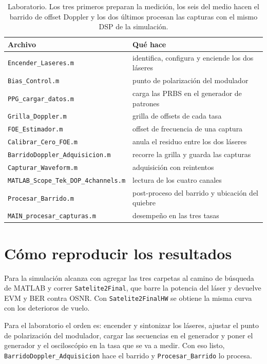 \begin{table}[htbp]
  \centering
  \small
  \begin{tabular}{ll}
    \toprule
    Archivo & Qu\'e hace \\
    \midrule
    \texttt{Encender\_Laseres.m}        & identifica, configura y enciende los dos l\'aseres \\
    \texttt{Bias\_Control.m}            & punto de polarizaci\'on del modulador \\
    \texttt{PPG\_cargar\_datos.m}       & carga las PRBS en el generador de patrones \\
    \midrule
    \texttt{Grilla\_Doppler.m}          & grilla de offsets de cada tasa \\
    \texttt{FOE\_Estimador.m}           & offset de frecuencia de una captura \\
    \texttt{Calibrar\_Cero\_FOE.m}      & anula el residuo entre los dos l\'aseres \\
    \texttt{BarridoDoppler\_Adquisicion.m} & recorre la grilla y guarda las capturas \\
    \texttt{Capturar\_Waveform.m}       & adquisici\'on con reintentos \\
    \texttt{MATLAB\_Scope\_Tek\_DOP\_4channels.m} & lectura de los cuatro canales \\
    \midrule
    \texttt{Procesar\_Barrido.m}        & post-proceso del barrido y ubicaci\'on del quiebre \\
    \texttt{MAIN\_procesar\_capturas.m} & desempe\~no en las tres tasas \\
    \bottomrule
  \end{tabular}
  \caption[Programas del laboratorio]{%
    Laboratorio. Los tres primeros preparan la medici\'on, los seis del medio
    hacen el barrido de offset Doppler y los dos \'ultimos procesan las
    capturas con el mismo DSP de la simulaci\'on.}
  \label{tab:ap-codigos-lab}
\end{table}

\section{C\'omo reproducir los resultados}
\label{sec:ap-reproducir}

Para la simulaci\'on alcanza con agregar las tres carpetas al camino de
b\'usqueda de MATLAB y correr \texttt{Satelite2Final}, que barre la potencia
del l\'aser y devuelve EVM y BER contra OSNR. Con \texttt{Satelite2FinalHW} se
obtiene la misma curva con los deterioros de vuelo. 

Para el laboratorio el orden es: encender y sintonizar los l\'aseres, ajustar
el punto de polarizaci\'on del modulador, cargar las secuencias en el generador
y poner el generador y el oscilosc\'opio en la tasa que se va a medir. Con eso
listo, \texttt{BarridoDoppler\_Adquisicion} hace el barrido y
\texttt{Procesar\_Barrido} lo procesa.
